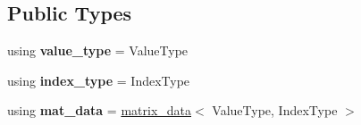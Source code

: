 \subsection*{Public Types}
\begin{DoxyCompactItemize}
\item 
\mbox{\label{classgko_1_1preconditioner_1_1Jacobi_a694f86b446a2d89775ae454abcab9c6a}} 
using {\bfseries value\+\_\+type} = Value\+Type
\item 
\mbox{\label{classgko_1_1preconditioner_1_1Jacobi_ac3ad950ee6df0404df192fdbf8aca159}} 
using {\bfseries index\+\_\+type} = Index\+Type
\item 
\mbox{\label{classgko_1_1preconditioner_1_1Jacobi_a75209ba14d90b99037e3d8ffef8477e6}} 
using {\bfseries mat\+\_\+data} = \hyperlink{structgko_1_1matrix__data}{matrix\+\_\+data}$<$ Value\+Type, Index\+Type $>$
\end{DoxyCompactItemize}
